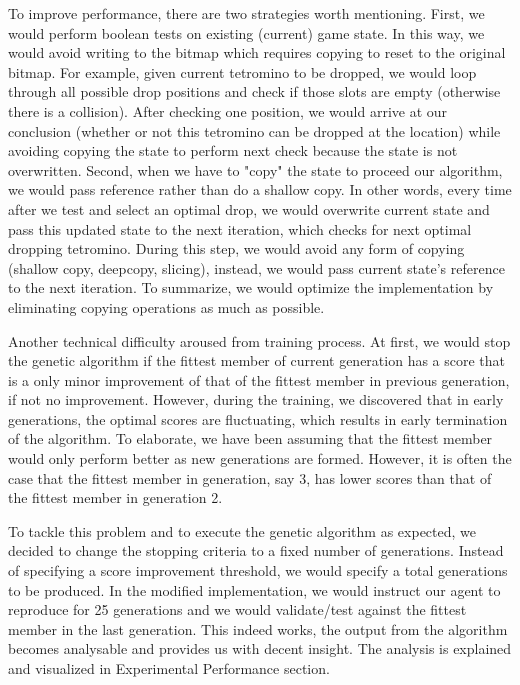 \documentclass[letterpaper]{article} %
\begin{document}
\begin{itemize}
  
  To improve performance, there are two strategies worth mentioning. First, we would perform boolean tests on existing (current) game state. In this way, we would avoid writing to the bitmap which requires copying to reset to the original bitmap. For example, given current tetromino to be dropped, we would loop through all possible drop positions and check if those slots are empty (otherwise there is a collision). After checking one position, we would arrive at our conclusion (whether or not this tetromino can be dropped at the location) while avoiding copying the state to perform next check because the state is not overwritten. Second, when we have to "copy" the state to proceed our algorithm, we would pass reference rather than do a shallow copy. In other words, every time after we test and select an optimal drop, we would overwrite current state and pass this updated state to the next iteration, which checks for next optimal dropping tetromino. During this step, we would avoid any form of copying (shallow copy, deepcopy, slicing), instead, we would pass current state's reference to the next iteration. To summarize, we would optimize the implementation by eliminating copying operations as much as possible.
  
  Another technical difficulty aroused from training process. At first, we would stop the genetic algorithm if the fittest member of current generation has a score that is a only minor improvement of that of the fittest member in previous generation, if not no improvement. However, during the training, we discovered that in early generations, the optimal scores are fluctuating, which results in early termination of the algorithm. To elaborate, we have been assuming that the fittest member would only perform better as new generations are formed. However, it is often the case that the fittest member in generation, say 3, has lower scores than that of the fittest member in generation 2. 
  
  To tackle this problem and to execute the genetic algorithm as expected, we decided to change the stopping criteria to a fixed number of generations. Instead of specifying a score improvement threshold, we would specify a total generations to be produced. In the modified implementation, we would instruct our agent to reproduce for 25 generations and we would validate/test against the fittest member in the last generation. This indeed works, the output from the algorithm becomes analysable and provides us with decent insight. The analysis is explained and visualized in Experimental Performance section.
  

\end{itemize}
\end{document}
